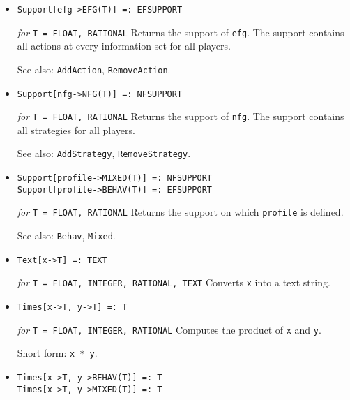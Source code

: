 \begin{itemize}
\item
\protect \large \begin{verbatim}
Support[efg->EFG(T)] =: EFSUPPORT
\end{verbatim}\normalsize

{\it for} {\tt T = FLOAT, RATIONAL}
\bd
Returns the support of \verb+efg+.  The support contains all actions at every
information set for all players.
\item [See also:] \verb+AddAction+, \verb+RemoveAction+.
\ed

\item
\protect \large \begin{verbatim}
Support[nfg->NFG(T)] =: NFSUPPORT
\end{verbatim}\normalsize

{\it for} {\tt T = FLOAT, RATIONAL}
\bd
Returns the support of \verb+nfg+.  The support contains all strategies
for all players.
\item [See also:] \verb+AddStrategy+, \verb+RemoveStrategy+.
\ed

\item
\protect \large \begin{verbatim}
Support[profile->MIXED(T)] =: NFSUPPORT
Support[profile->BEHAV(T)] =: EFSUPPORT
\end{verbatim}\normalsize

{\it for} {\tt T = FLOAT, RATIONAL}
\bd
Returns the support on which \verb+profile+ is defined.
\item [See also:] \verb+Behav+, \verb+Mixed+.
\ed


\item
\protect \large \begin{verbatim}
Text[x->T] =: TEXT
\end{verbatim} \normalsize

{\it for} {\tt T = FLOAT, INTEGER, RATIONAL, TEXT}
\bd
Converts \verb+x+ into a text string.
\ed

\item 
\protect \large \begin{verbatim}
Times[x->T, y->T] =: T
\end{verbatim} \normalsize

{\it for} {\tt T = FLOAT, INTEGER, RATIONAL}
\bd
Computes the product of \verb+x+ and \verb+y+.
\item [Short form:] \verb+x * y+.
\ed

\item
\protect \large \begin{verbatim}
Times[x->T, y->BEHAV(T)] =: T
Times[x->T, y->MIXED(T)] =: T
\end{verbatim} \normalsize


\end{itemize}
